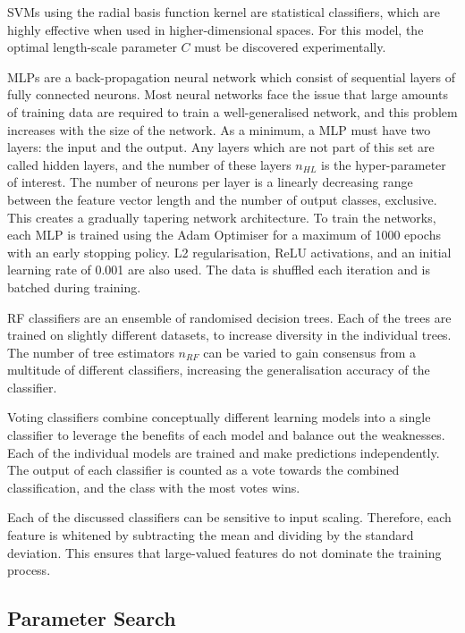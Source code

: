 \documentclass{IEEEtran}
\newcommand{\nhl}{\ensuremath{n_{HL}}}
\newcommand{\nrf}{\ensuremath{n_{RF}}}
\begin{document}
	SVMs using the radial basis function kernel are statistical classifiers, which are highly effective when used in higher-dimensional spaces. For this model, the optimal length-scale parameter $C$ must be discovered experimentally.
	
	MLPs are a back-propagation neural network which consist of sequential layers of fully connected neurons. Most neural networks face the issue that large amounts of training data are required to train a well-generalised network, and this problem increases with the size of the network. As a minimum, a MLP must have two layers: the input and the output. Any layers which are not part of this set are called hidden layers, and the number of these layers $\nhl$ is the hyper-parameter of interest. The number of neurons per layer is a linearly decreasing range between the feature vector length and the number of output classes, exclusive. This creates a gradually tapering network architecture. To train the networks, each MLP is trained using the Adam Optimiser for a maximum of 1000 epochs with an early stopping policy. L2 regularisation, ReLU activations, and an initial learning rate of 0.001 are also used. The data is shuffled each iteration and is batched during training. 
	
	RF classifiers are an ensemble of randomised decision trees. Each of the trees are trained on slightly different datasets, to increase diversity in the individual trees. The number of tree estimators $\nrf$ can be varied to gain consensus from a multitude of different classifiers, increasing the generalisation accuracy of the classifier. 
	
	Voting classifiers combine conceptually different learning models into a single classifier to leverage the benefits of each model and balance out the weaknesses. Each of the individual models are trained and make predictions independently. The output of each classifier is counted as a vote towards the combined classification, and the class with the most votes wins. 
	
	Each of the discussed classifiers can be sensitive to input scaling. Therefore, each feature is whitened by subtracting the mean and dividing by the standard deviation. This ensures that large-valued features do not dominate the training process.
	
	\subsection{Parameter Search}
	
\end{document}
